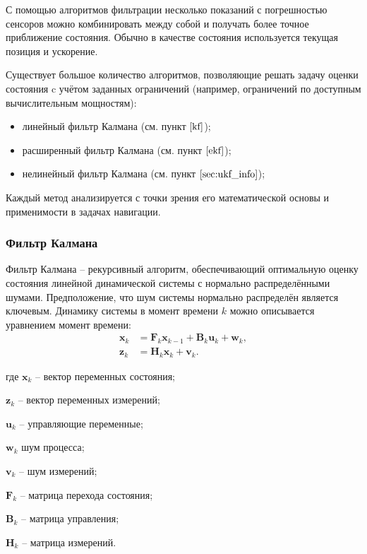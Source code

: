 {С помощью алгоритмов фильтрации несколько показаний с погрешностью сенсоров
можно комбинировать между собой и получать более точное приближение состояния.
Обычно в качестве состояния используется текущая позиция и ускорение.

Существует большое количество алгоритмов, позволяющие решать задачу оценки
состояния c учётом заданных ограничений (например, ограничений по доступным
вычислительным мощностям):

\begin{itemize}
	\item линейный фильтр Калмана (см. пункт $\ref{kf}$);
	\item расширенный фильтр Калмана (см. пункт $\ref{ekf}$);
	\item нелинейный фильтр Калмана (см. пункт $\ref{sec:ukf_info}$);
\end{itemize}

Каждый метод анализируется с точки зрения его математической основы и
применимости в задачах навигации.

\subsubsection{Фильтр Калмана}
\label{kf}
Фильтр Калмана -- рекурсивный алгоритм, обеспечивающий оптимальную оценку
состояния линейной динамической системы с нормально распределёнными шумами.
Предположение, что шум системы нормально распределён является ключевым. Динамику
системы в момент времени \( k \) можно описывается уравнением момент времени:
\begin{align}
    \mathbf{x}_k &= \mathbf{F}_k \mathbf{x}_{k-1} + \mathbf{B}_k \mathbf{u}_k + \mathbf{w}_k, \label{eq:kalman_state} \\
    \mathbf{z}_k &= \mathbf{H}_k \mathbf{x}_k + \mathbf{v}_k. \label{eq:kalman_meas}
\end{align}

\begin{explanationx}
	\item[где] \(\mathbf{x}_k\) -- вектор переменных состояния;
	\item \(\mathbf{z}_k\) -- вектор переменных измерений;
	\item \(\mathbf{u}_k\) -- управляющие переменные;
	\item \(\mathbf{w}_k\) шум процесса;
	\item \(\mathbf{v}_k \) -- шум измерений;
	\item \(\mathbf{F}_k\) -- матрица перехода состояния;
	\item \(\mathbf{B}_k\) -- матрица управления;
	\item \(\mathbf{H}_k\) -- матрица измерений.
\end{explanationx}

}
